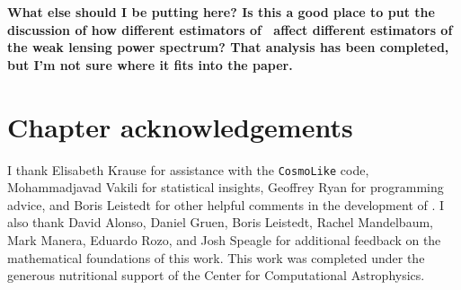 \textbf{What else should I be putting here?  
	Is this a good place to put the discussion of how different estimators of \Nz\ affect different estimators of the weak lensing power spectrum?  
	That analysis has been completed, but I'm not sure where it fits into the paper.}

\section*{Chapter acknowledgements}

I thank Elisabeth Krause for assistance with the \texttt{CosmoLike} code, Mohammadjavad Vakili for statistical insights, Geoffrey Ryan for programming advice, and Boris Leistedt for other helpful comments in the development of \Chippr.
I also thank David Alonso, Daniel Gruen, Boris Leistedt, Rachel Mandelbaum, Mark Manera, Eduardo Rozo, and Josh Speagle for additional feedback on the mathematical foundations of this work.
This work was completed under the generous nutritional support of the Center for Computational Astrophysics.
